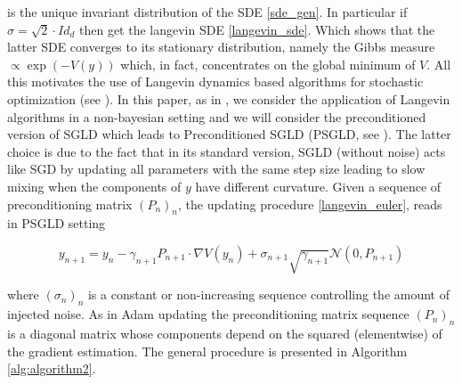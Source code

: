 \documentclass{article}
\numberwithin{equation}{section}
\begin{document}
\noindent
is the unique invariant distribution of the SDE \eqref{sde_gen}. In particular if $\sigma = \sqrt{2} \cdot Id_d$ then get the langevin SDE \eqref{langevin_sde}. Which shows that the latter SDE converges to its stationary distribution, namely the Gibbs measure $\propto \exp(-V(y))$ which, in fact, concentrates on the global minimum of $V$. All this motivates the use of Langevin dynamics based algorithms for stochastic optimization (see \cite{ bras2022langevin, PierreLangevin, Jospin_2022}). In this paper, as in \cite{PierreLangevin}, we consider the application of Langevin algorithms in a non-bayesian setting and we will consider the preconditioned version of SGLD which leads to Preconditioned SGLD (PSGLD, see \cite{Li2016PreconditionedSG}). The latter choice is due to the fact that in its standard version, SGLD (without noise) acts like SGD by updating all parameters with the same step size leading to slow mixing when the components of $y$ have different curvature. Given a sequence of preconditioning matrix $(P_n)_n$, the updating procedure \eqref{langevin_euler}, reads in PSGLD setting

\begin{equation}
y_{n+1} = y_n - \gamma_{n+1}P_{n+1} \cdot \nabla V(y_n) + \sigma_{n+1} \sqrt{\gamma_{n+1}} \mathcal{N}(0, P_{n+1})
\end{equation}


\noindent
where $(\sigma_n)_n$ is a constant or non-increasing sequence controlling the amount of injected noise. As in Adam updating the preconditioning matrix sequence $(P_n)_n$ is a diagonal matrix whose components depend on the squared (elementwise) of the gradient estimation. The general procedure is presented in Algorithm \ref{alg:algorithm2}.

\newpage
\end{document}
